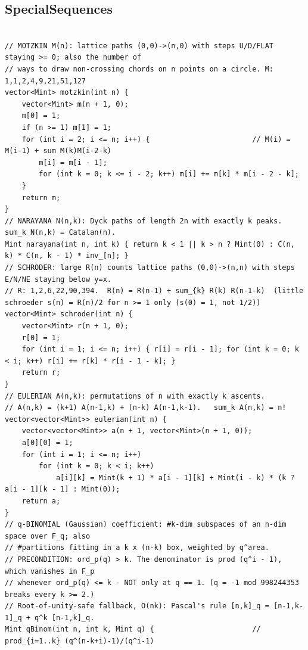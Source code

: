 \documentclass[9pt,a4paper,twocolumn]{extarticle}
\begin{document}
\filbreak
\subsection{SpecialSequences}
\nopagebreak
\begin{lstlisting}

// MOTZKIN M(n): lattice paths (0,0)->(n,0) with steps U/D/FLAT staying >= 0; also the number of
// ways to draw non-crossing chords on n points on a circle. M: 1,1,2,4,9,21,51,127
vector<Mint> motzkin(int n) {
    vector<Mint> m(n + 1, 0);
    m[0] = 1;
    if (n >= 1) m[1] = 1;
    for (int i = 2; i <= n; i++) {                        // M(i) = M(i-1) + sum M(k)M(i-2-k)
        m[i] = m[i - 1];
        for (int k = 0; k <= i - 2; k++) m[i] += m[k] * m[i - 2 - k];
    }
    return m;
}
// NARAYANA N(n,k): Dyck paths of length 2n with exactly k peaks. sum_k N(n,k) = Catalan(n).
Mint narayana(int n, int k) { return k < 1 || k > n ? Mint(0) : C(n, k) * C(n, k - 1) * inv_[n]; }
// SCHRODER: large R(n) counts lattice paths (0,0)->(n,n) with steps E/N/NE staying below y=x.
// R: 1,2,6,22,90,394.  R(n) = R(n-1) + sum_{k} R(k) R(n-1-k)  (little schroeder s(n) = R(n)/2 for n >= 1 only (s(0) = 1, not 1/2))
vector<Mint> schroder(int n) {
    vector<Mint> r(n + 1, 0);
    r[0] = 1;
    for (int i = 1; i <= n; i++) { r[i] = r[i - 1]; for (int k = 0; k < i; k++) r[i] += r[k] * r[i - 1 - k]; }
    return r;
}
// EULERIAN A(n,k): permutations of n with exactly k ascents.
// A(n,k) = (k+1) A(n-1,k) + (n-k) A(n-1,k-1).   sum_k A(n,k) = n!
vector<vector<Mint>> eulerian(int n) {
    vector<vector<Mint>> a(n + 1, vector<Mint>(n + 1, 0));
    a[0][0] = 1;
    for (int i = 1; i <= n; i++)
        for (int k = 0; k < i; k++)
            a[i][k] = Mint(k + 1) * a[i - 1][k] + Mint(i - k) * (k ? a[i - 1][k - 1] : Mint(0));
    return a;
}
// q-BINOMIAL (Gaussian) coefficient: #k-dim subspaces of an n-dim space over F_q; also
// #partitions fitting in a k x (n-k) box, weighted by q^area.
// PRECONDITION: ord_p(q) > k. The denominator is prod (q^i - 1), which vanishes in F_p
// whenever ord_p(q) <= k - NOT only at q == 1. (q = -1 mod 998244353 breaks every k >= 2.)
// Root-of-unity-safe fallback, O(nk): Pascal's rule [n,k]_q = [n-1,k-1]_q + q^k [n-1,k]_q.
Mint qBinom(int n, int k, Mint q) {                       // prod_{i=1..k} (q^(n-k+i)-1)/(q^i-1)

\end{lstlisting}
\end{document}
